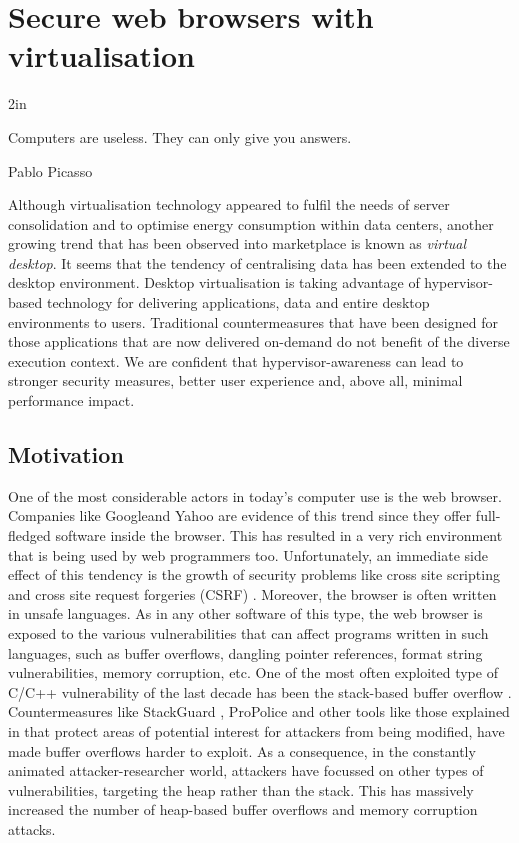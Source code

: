 \chapter{Secure web browsers with virtualisation}\label{bubble}

\epigraph{2in}{Computers are useless. They can only give you answers.}{Pablo Picasso}{}


Although virtualisation technology appeared to fulfil the needs of server consolidation and to optimise energy consumption within data centers, another growing trend that has been observed into marketplace is known as \emph{virtual desktop}.
It seems that the tendency of centralising data has been extended to the desktop environment. Desktop virtualisation is taking advantage of hypervisor-based technology for delivering applications, data and entire desktop environments to users. 
Traditional countermeasures that have been designed for those applications that are now delivered on-demand do not benefit of the diverse execution context. 
We are confident that hypervisor-awareness can lead to stronger security measures, better user experience and, above all, minimal performance impact.

\section{Motivation}
One of the most considerable actors in today's computer use is the web browser. Companies like Google\texttrademark and Yahoo are evidence of this trend since they offer full-fledged software inside the browser. 
This has resulted in a very rich environment that is being used by web programmers too. Unfortunately, an immediate side effect of this tendency is the growth of security problems like cross site scripting and cross site request forgeries (CSRF) \cite{xss,csrf,csrf2}. 
Moreover, the browser is often written in unsafe languages. As in any other software of this type, the web browser is exposed to the various vulnerabilities that can affect programs written in such languages, such as buffer overflows, dangling pointer references, format string vulnerabilities, memory corruption, etc.
One of the most often exploited type of C/C++ vulnerability of the last decade has been the stack-based buffer overflow \cite{dalton2008real}. Countermeasures like StackGuard \cite{Wagle:2003:SGS}, ProPolice \cite{Etoh:2000:PSS} and other tools like those explained in \cite{dep, wilander2003comparison} that protect areas of potential interest for attackers from being modified, have made buffer overflows harder to exploit. 
As a consequence, in the constantly animated attacker-researcher world, attackers have focussed on other types of vulnerabilities, targeting the heap rather than the stack. 
This has massively increased the number of heap-based buffer overflows and memory corruption attacks.

